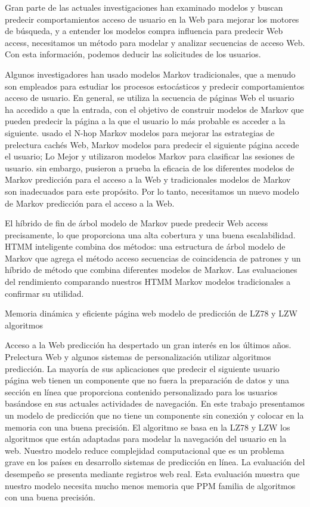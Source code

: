 Gran parte de las actuales investigaciones han examinado modelos y buscan predecir comportamientos acceso de usuario en la Web para mejorar los motores de búsqueda, y a entender los modelos compra influencia para predecir Web access, necesitamos un método para modelar y analizar secuencias de acceso Web. Con esta información, podemos deducir las solicitudes de los usuarios.

Algunos investigadores han usado modelos Markov tradicionales, que a menudo son empleados para estudiar los procesos estocásticos y predecir comportamientos acceso de usuario. En general, se utiliza la secuencia de páginas Web el usuario ha accedido a que la entrada, con el objetivo de construir modelos de Markov que pueden predecir la página a la que el usuario lo más probable es acceder a la siguiente.  usado el N-hop Markov modelos para mejorar las estrategias de prelectura cachés Web,  Markov modelos para predecir el siguiente página accede el usuario;  Lo Mejor y  utilizaron modelos Markov para clasificar las sesiones de usuario.  sin embargo, pusieron a prueba la eficacia de los diferentes modelos de Markov predicción para el acceso a la Web y tradicionales modelos de Markov son inadecuados para este propósito. Por lo tanto, necesitamos un nuevo modelo de Markov predicción para el acceso a la Web.

El híbrido de fin de árbol modelo de Markov puede predecir Web access precisamente, lo que proporciona una alta cobertura y una buena escalabilidad. HTMM inteligente combina dos métodos: una estructura de árbol modelo de Markov que agrega el método acceso secuencias de coincidencia de patrones y un híbrido de método que combina diferentes modelos de Markov. Las evaluaciones del rendimiento comparando nuestros HTMM Markov modelos tradicionales a confirmar su utilidad.




Memoria dinámica y eficiente página web modelo de predicción de LZ78 y LZW algoritmos

Acceso a la Web predicción ha despertado un gran interés en los últimos años. Prelectura Web y algunos sistemas de personalización utilizar algoritmos predicción. La mayoría de sus aplicaciones que predecir el siguiente usuario página web tienen un componente que no fuera la preparación de datos y una sección en línea que proporciona contenido personalizado para los usuarios basándose en sus actuales actividades de navegación. En este trabajo presentamos un modelo de predicción que no tiene un componente sin conexión y colocar en la memoria con una buena precisión. El algoritmo se basa en la LZ78 y LZW los algoritmos que están adaptadas para modelar la navegación del usuario en la web. Nuestro modelo reduce complejidad computacional que es un problema grave en los países en desarrollo sistemas de predicción en línea. La evaluación del desempeño se presenta mediante registros web real. Esta evaluación muestra que nuestro modelo necesita mucho menos memoria que PPM familia de algoritmos con una buena precisión.


